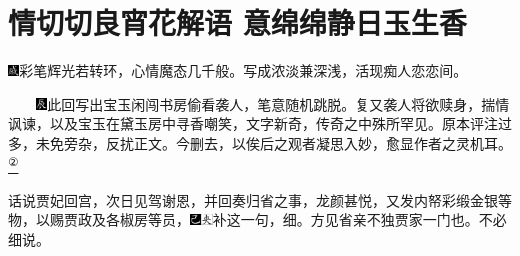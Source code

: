 

\chapter{情切切良宵花解语 意绵绵静日玉生香}

{\includegraphics[width=3mm]{../Images/00005}彩笔辉光若转环，心情魔态几千般。写成浓淡兼深浅，活现痴人恋恋间。}

{　　\includegraphics[width=3mm]{../Images/00009}此回写出宝玉闲闯书房偷看袭人，笔意随机跳脱。复又袭人将欲赎身，揣情讽谏，以及宝玉在黛玉房中寻香嘲笑，文字新奇，传奇之中殊所罕见。原本评注过多，未免旁杂，反扰正文。今删去，以俟后之观者凝思入妙，愈显作者之灵机耳。}\href{../Text/part0023_split_000.html\#lnkback_2_a}{\textsuperscript{②}}{}

话说贾妃回宫，次日见驾谢恩，并回奏归省之事，龙颜甚悦，又发内帑彩缎金银等物，以赐贾政及各椒房等员，{\includegraphics[width=3mm]{../Images/00003}\includegraphics[width=3mm]{../Images/00012}\footnotesize \kaishu 补这一句，细。方见省亲不独贾家一门也。}不必细说。

